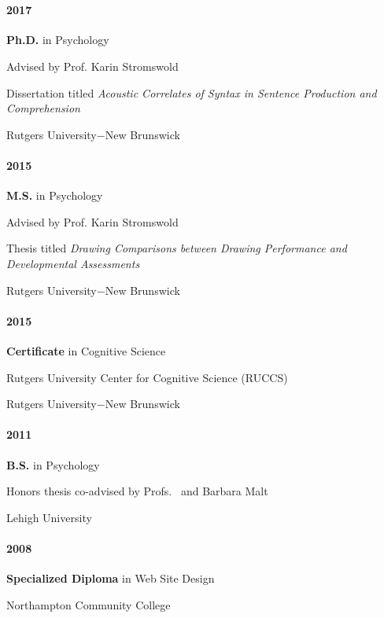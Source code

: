 \section*{}
\label{sec:education}

\paragraph{2017} \textbf{Ph.D.} in Psychology


\indent\hphantom{~~~~} Advised by Prof. Karin Stromswold


\indent\hphantom{~~~~} Dissertation titled \textit{Acoustic Correlates of Syntax in Sentence Production and Comprehension}


\indent\hphantom{~~~~} Rutgers University$-$New Brunswick


 \paragraph{2015} \textbf{M.S.} in Psychology


\indent\hphantom{~~~~} Advised by Prof. Karin Stromswold


\indent\hphantom{~~~~} Thesis titled \textit{Drawing Comparisons between Drawing Performance and Developmental Assessments}


\indent\hphantom{~~~~} Rutgers University$-$New Brunswick


\paragraph{2015}\textbf{Certificate} in Cognitive Science


\indent\hphantom{~~~~} Rutgers University Center for Cognitive Science (RUCCS)


\indent\hphantom{~~~~} Rutgers University$-$New Brunswick

\paragraph{2011}\textbf{B.S.} in Psychology

\indent\hphantom{~~~~} Honors thesis co-advised by Profs. \pat~and Barbara Malt

\indent\hphantom{~~~~} Lehigh University


\paragraph{2008}\textbf{Specialized Diploma} in Web Site Design

\indent\hphantom{~~~~} Northampton Community College
